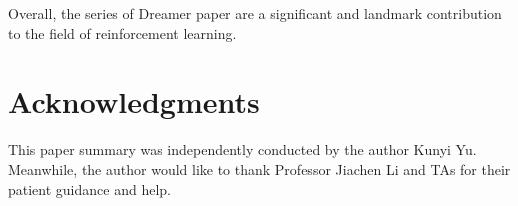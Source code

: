 \documentclass{article}
\begin{document}
Overall, the series of Dreamer paper are a significant and landmark contribution to the field of reinforcement learning.




\section*{Acknowledgments}
This paper summary was independently conducted by the author Kunyi Yu. Meanwhile, the author would like to thank Professor Jiachen Li and TAs for their patient guidance and help.
\end{document}
